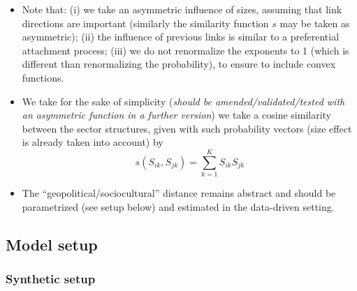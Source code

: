 \documentclass{article}
\begin{document}
\begin{enumerate}
\begin{itemize}
    \item Note that: (i) we take an asymmetric influence of sizes, assuming that link directions are important (similarly the similarity function $s$ may be taken as asymmetric); (ii) the influence of previous links is similar to a preferential attachment process; (iii) we do not renormalize the exponents to 1 (which is different than renormalizing the probability), to ensure to include convex functions.
    \item We take for the sake of simplicity (\textit{should be amended/validated/tested with an asymmetric function in a further version}) we take a cosine similarity between the sector structures, given with such probability vectors (size effect is already taken into account) by
    \begin{equation}
        s\left(S_{ik},S_{jk}\right) = \sum_{k=1}^{K} S_{ik} S_{jk}
    \end{equation}
    
    \item The ``geopolitical/sociocultural'' distance remains abstract and should be parametrized (see setup below) and estimated in the data-driven setting.
    \end{itemize}
\end{enumerate}

\subsection{Model setup}

\subsubsection{Synthetic setup}
\end{document}
